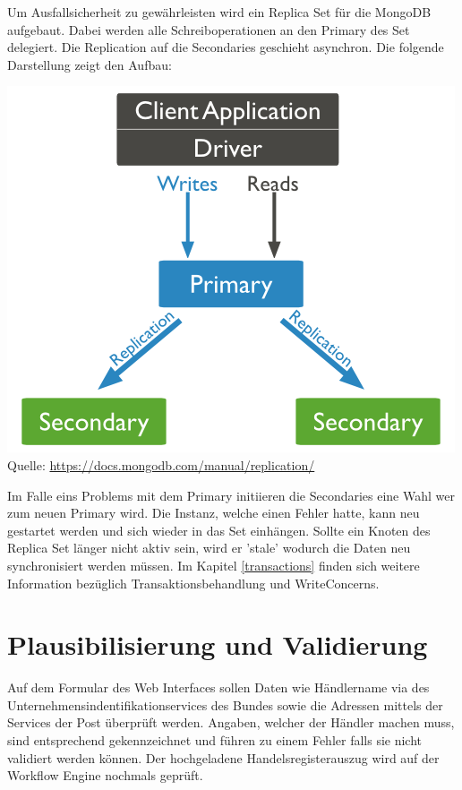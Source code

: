 Um Ausfallsicherheit zu gewährleisten wird ein Replica Set für die MongoDB aufgebaut. Dabei werden alle Schreiboperationen an den Primary des Set delegiert. Die Replication auf die Secondaries geschieht asynchron. Die folgende Darstellung zeigt den Aufbau:
\begin{center}
	\includegraphics[scale=0.6]{mongodb-replicaset.png}\newline
	Quelle: \url{https://docs.mongodb.com/manual/replication/}
\end{center}
Im Falle eins Problems mit dem Primary initiieren die Secondaries eine Wahl wer zum neuen Primary wird. Die Instanz, welche einen Fehler hatte, kann neu gestartet werden und sich wieder in das Set einhängen. Sollte ein Knoten des Replica Set länger nicht aktiv sein, wird er 'stale' wodurch die Daten neu synchronisiert werden müssen. Im Kapitel \ref{transactions} finden sich weitere Information bezüglich Transaktionsbehandlung und WriteConcerns.

\section{Plausibilisierung und Validierung}

Auf dem Formular des Web Interfaces sollen Daten wie Händlername via des Unternehmensindentifikationservices des Bundes sowie die Adressen mittels der Services der Post überprüft werden. Angaben, welcher der Händler machen muss, sind entsprechend gekennzeichnet und führen zu einem Fehler falls sie nicht validiert werden können. Der hochgeladene Handelsregisterauszug wird auf der Workflow Engine nochmals geprüft.

